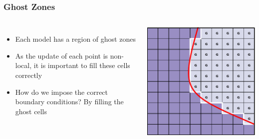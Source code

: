 \documentclass{beamer}
\begin{document}
\begin{frame}
\frametitle{Ghost Zones}
\begin{columns}
\begin{itemize}
\item{Each model has a region of ghost zones}
\item{As the update of each point is non-local, it is important to fill these cells correctly}
\item{How do we impose the correct boundary conditions? By filling the ghost cells}
\end{itemize}
\includegraphics[width=\textwidth]{../images/multimodel_ghostcells.pdf}
\end{columns}
\end{frame}
\end{document}

